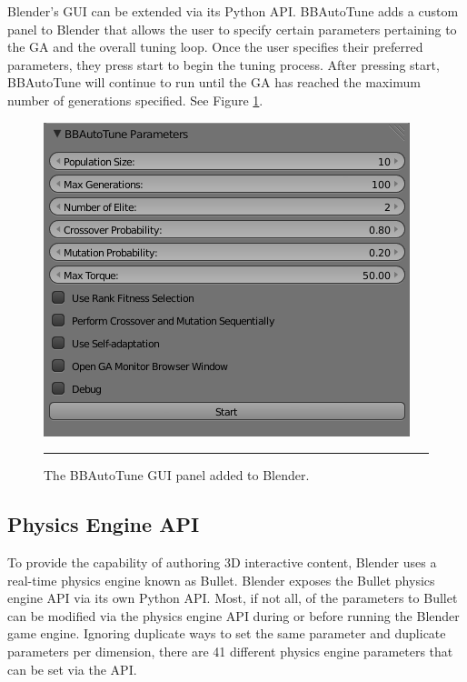 Blender's GUI can be extended via its Python API. BBAutoTune adds a custom panel to Blender that allows the user to specify certain parameters pertaining to the GA and the overall tuning loop. Once the user specifies their preferred parameters, they press start to begin the tuning process. After pressing start, BBAutoTune will continue to run until the GA has reached the maximum number of generations specified. See Figure \ref{fig:bbautotune_gui}. 

\begin{figure}[htbp]
\centering
\includegraphics[scale=0.6]{../Figures/Chapter4/bbautotune_gui.png}
\rule{35em}{0.5pt}
\caption[BBAutoTune GUI Panel]{The BBAutoTune GUI panel added to Blender.}
\label{fig:bbautotune_gui}
\end{figure}

\subsection{Physics Engine API}

To provide the capability of authoring 3D interactive content, Blender uses a real-time physics engine known as Bullet. Blender exposes the Bullet physics engine API via its own Python API. Most, if not all, of the parameters to Bullet can be modified via the physics engine API during or before running the Blender game engine. Ignoring duplicate ways to set the same parameter and duplicate parameters per dimension, there are 41 different physics engine parameters that can be set via the API.


